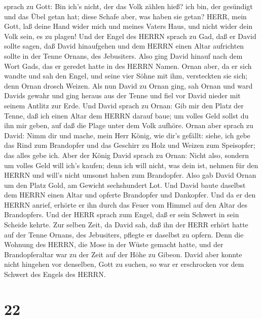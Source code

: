 sprach zu Gott: Bin ich's nicht, der das Volk zählen hieß? ich bin, der
gesündigt und das Übel getan hat; diese Schafe aber, was haben sie
getan? HERR, mein Gott, laß deine Hand wider mich und meines Vaters
Haus, und nicht wider dein Volk sein, es zu plagen!  Und
der Engel des HERRN sprach zu Gad, daß er David sollte sagen, daß David
hinaufgehen und dem HERRN einen Altar aufrichten sollte in der Tenne
Ornans, des Jebusiters.  Also ging David hinauf nach dem
Wort Gads, das er geredet hatte in des HERRN Namen.  Ornan
aber, da er sich wandte und sah den Engel, und seine vier Söhne mit ihm,
versteckten sie sich; denn Ornan drosch Weizen.  Als nun
David zu Ornan ging, sah Ornan und ward Davids gewahr und ging heraus
aus der Tenne und fiel vor David nieder mit seinem Antlitz zur Erde.
 Und David sprach zu Ornan: Gib mir den Platz der Tenne,
daß ich einen Altar dem HERRN darauf baue; um volles Geld sollst du ihn
mir geben, auf daß die Plage unter dem Volk aufhöre.  Ornan
aber sprach zu David: Nimm dir und mache, mein Herr König, wie dir's
gefällt: siehe, ich gebe das Rind zum Brandopfer und das Geschirr zu
Holz und Weizen zum Speisopfer; das alles gebe ich.  Aber
der König David sprach zu Ornan: Nicht also, sondern um volles Geld will
ich's kaufen; denn ich will nicht, was dein ist, nehmen für den HERRN
und will's nicht umsonst haben zum Brandopfer.  Also gab
David Ornan um den Platz Gold, am Gewicht sechshundert Lot.
 Und David baute daselbst dem HERRN einen Altar und opferte
Brandopfer und Dankopfer. Und da er den HERRN anrief, erhörte er ihn
durch das Feuer vom Himmel auf den Altar des Brandopfers. 
Und der HERR sprach zum Engel, daß er sein Schwert in sein Scheide
kehrte.  Zur selben Zeit, da David sah, daß ihn der HERR
erhört hatte auf der Tenne Ornans, des Jebusiters, pflegte er daselbst
zu opfern.  Denn die Wohnung des HERRN, die Mose in der
Wüste gemacht hatte, und der Brandopferaltar war zu der Zeit auf der
Höhe zu Gibeon.  David aber konnte nicht hingehen vor
denselben, Gott zu suchen, so war er erschrocken vor dem Schwert des
Engels des HERRN.

\hypertarget{section-21}{%
\section{22}\label{section-21}}

